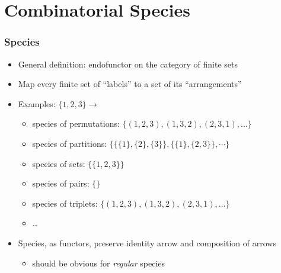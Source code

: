 \section{Combinatorial Species}

\begin{frame}
\frametitle{Species}

\begin{itemize}[<+->]
\item General definition: endofunctor on the category of finite sets

\item Map every finite set of ``labels'' to a set of its ``arrangements''

\item Examples: $\{1, 2, 3\} \rightarrow$

\begin{itemize}
\item species of permutations:
$\big\{(1,2,3), (1,3,2), (2,3,1), \dots\big\}$
\item species of partitions:
$\Big\{\big\{\{1\},\{2\},\{3\}\big\}, \big\{\{1\}, \{2,3\}\big\}, \cdots \Big\}$
\item species of sets:
$\big\{\{1,2,3\}\big\}$
\item species of pairs:
$\{\}$
\item species of triplets:
$\big\{(1,2,3), (1,3,2), (2,3,1), \dots\big\}$
\item \dots
\end{itemize}

\item Species, as functors, preserve identity arrow and composition of arrows
\begin{itemize}
\item should be obvious for \textit{regular} species
\end{itemize}
\end{itemize}
\end{frame}

